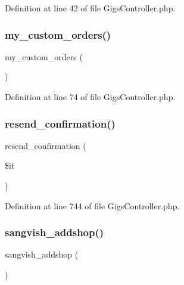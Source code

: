 Definition at line 42 of file Gigs\+Controller.\+php.

\mbox{\label{class_responsive_1_1_http_1_1_controllers_1_1_gigs_controller_a0bde17da10f6d25317648760e0c61371}} 
\subsubsection{\texorpdfstring{my\_custom\_orders()}{my\_custom\_orders()}}
{\footnotesize\ttfamily my\+\_\+custom\+\_\+orders (\begin{DoxyParamCaption}{ }\end{DoxyParamCaption})}



Definition at line 74 of file Gigs\+Controller.\+php.

\mbox{\label{class_responsive_1_1_http_1_1_controllers_1_1_gigs_controller_a74554f9e8baf213314259dc90918da34}} 
\subsubsection{\texorpdfstring{resend\_confirmation()}{resend\_confirmation()}}
{\footnotesize\ttfamily resend\+\_\+confirmation (\begin{DoxyParamCaption}\item[{}]{\$it }\end{DoxyParamCaption})}



Definition at line 744 of file Gigs\+Controller.\+php.

\mbox{\label{class_responsive_1_1_http_1_1_controllers_1_1_gigs_controller_a94ca394576518bac9378129d4e6698ce}} 
\subsubsection{\texorpdfstring{sangvish\_addshop()}{sangvish\_addshop()}}
{\footnotesize\ttfamily sangvish\+\_\+addshop (\begin{DoxyParamCaption}{ }\end{DoxyParamCaption})}




